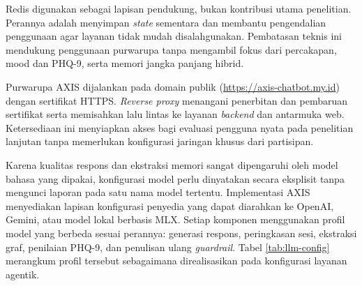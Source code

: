 Redis digunakan sebagai lapisan pendukung, bukan kontribusi utama penelitian. Perannya adalah menyimpan \textit{state} sementara dan membantu pengendalian penggunaan agar layanan tidak mudah disalahgunakan. Pembatasan teknis ini mendukung penggunaan purwarupa tanpa mengambil fokus dari percakapan, mood dan PHQ-9, serta memori jangka panjang hibrid.

Purwarupa AXIS dijalankan pada domain publik (\url{https://axis-chatbot.my.id}) dengan sertifikat HTTPS. \textit{Reverse proxy} menangani penerbitan dan pembaruan sertifikat serta memisahkan lalu lintas ke layanan \textit{backend} dan antarmuka web. Ketersediaan ini menyiapkan akses bagi evaluasi pengguna nyata pada penelitian lanjutan tanpa memerlukan konfigurasi jaringan khusus dari partisipan.

Karena kualitas respons dan ekstraksi memori sangat dipengaruhi oleh model bahasa yang dipakai, konfigurasi model perlu dinyatakan secara eksplisit tanpa mengunci laporan pada satu nama model tertentu. Implementasi AXIS menyediakan lapisan konfigurasi penyedia yang dapat diarahkan ke OpenAI, Gemini, atau model lokal berbasis MLX. Setiap komponen menggunakan profil model yang berbeda sesuai perannya: generasi respons, peringkasan sesi, ekstraksi graf, penilaian PHQ-9, dan penulisan ulang \textit{guardrail}. Tabel \ref{tab:llm-config} merangkum profil tersebut sebagaimana direalisasikan pada konfigurasi layanan agentik.

